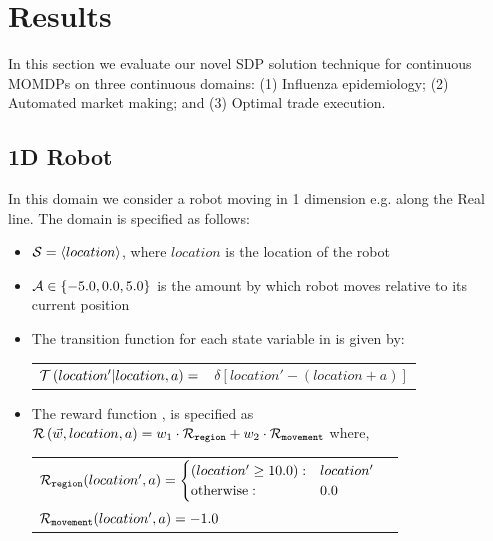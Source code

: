 \section{Results}
\label{sec:results}

In this section we evaluate our novel SDP solution technique for continuous MOMDPs on three continuous domains: (1) Influenza epidemiology; (2) Automated market making; and (3) Optimal trade execution.

\subsection{1D Robot}
\label{ref:robot}

In this domain we consider a robot moving in 1 dimension e.g. along the Real line. The domain is specified as follows:
\begin{itemize}
    \item {\footnotesize $ \mathcal{S} = \left\langle location \right\rangle$}, where $ location $ is the location of the robot
    \item {\footnotesize $ \mathcal{A} \in \left\lbrace -5.0, 0.0, 5.0 \right\rbrace $} is the amount by which robot moves relative to its current position
    \item The transition function {\footnotesize \Transition} for each state variable in {\footnotesize \State} is given by:    
    {\footnotesize 
        \abovedisplayskip=5pt
        \belowdisplayskip=0pt
        \renewcommand{\arraystretch}{1.5}
        \begin{tabular}{ll}
            $ \mathcal{T}\left( location' | location, a \right) =$ & $ \delta \left[ location' - (location + a) \right] $ \\
        \end{tabular}
    }%
    \item The reward function {\footnotesize \Reward}, is specified as {\footnotesize $ \mathcal{R}\left(\vec{w}, location, a \right) = w_1 \cdot \mathcal{R}_{\mathtt{region}} + w_2 \cdot \mathcal{R}_{\mathtt{movement}} $} where, \\
    {\footnotesize 
        \abovedisplayskip=10pt
        \belowdisplayskip=0pt
        \renewcommand{\arraystretch}{1.5}
        \begin{tabular}{ll}    
            $ \mathcal{R}_{\mathtt{region}}(location', a) = \begin{cases}
            (location' \geq 10.0) : & location' \\
            \text{otherwise} : & 0.0 \\
            \end{cases} $ & $ $\\
            $ \mathcal{R}_{\mathtt{movement}}(location', a) = -1.0 $ & $ $ \\                        
        \end{tabular}
    }    
\end{itemize} 

